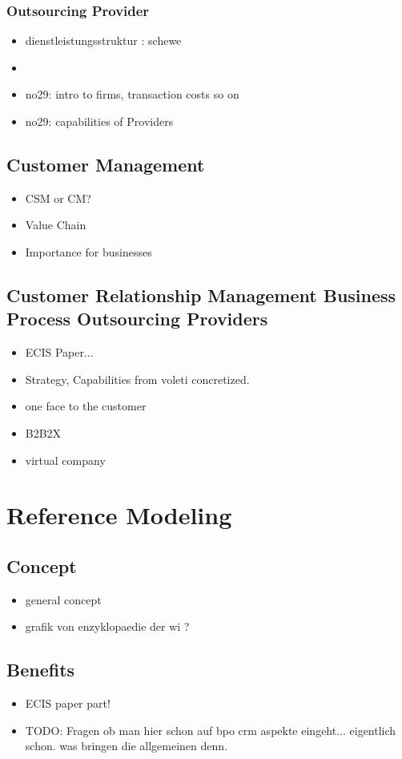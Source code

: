 		\subsubsection{Outsourcing Provider}
		\begin{itemize}
			\item dienstleistungsstruktur  : schewe
			\item 
			\item no29: intro to firms, transaction costs so on
			\item no29: capabilities of Providers
		\end{itemize}
		\subsection{Customer Management}
		\begin{itemize}
			\item CSM or CM?
			\item Value Chain
			\item Importance for businesses
		\end{itemize}
		\subsection{Customer Relationship Management Business Process Outsourcing Providers}
		\begin{itemize}
			\item ECIS Paper...
			\item Strategy, Capabilities from voleti concretized. 
			\item one face to the customer
			\item B2B2X
			\item virtual company
		\end{itemize}
	\section{Reference Modeling}
		\subsection{Concept}
		\begin{itemize}
			\item general concept
			\item grafik von enzyklopaedie der wi ?
		\end{itemize}
		\subsection{Benefits}
		\begin{itemize}
			\item  ECIS paper part!
			\item TODO: Fragen ob man hier schon auf bpo crm aspekte eingeht... eigentlich schon. was bringen die allgemeinen denn. 
		\end{itemize}
